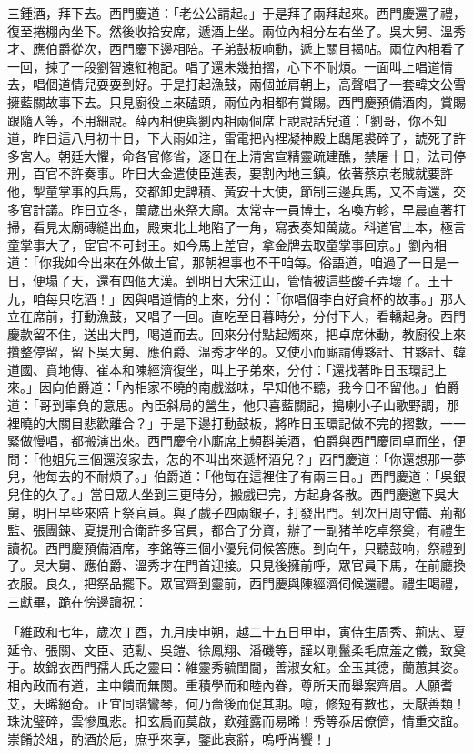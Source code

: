 \begin{showcontents}{}
三鍾酒，拜下去。西門慶道：「老公公請起。」于是拜了兩拜起來。西門慶還了禮，復至捲棚內坐下。然後收拾安席，遞酒上坐。兩位內相分左右坐了。吳大舅、溫秀才、應伯爵從次，西門慶下邊相陪。子弟鼓板响動，遞上關目揭帖。兩位內相看了一回，揀了一段劉智遠紅袍記。唱了還未幾拍摺，心下不耐煩。一面叫上唱道情去，唱個道情兒耍耍到好。于是打起漁鼓，兩個並肩朝上，高聲唱了一套韓文公雪擁藍關故事下去。只見廚役上來磕頭，兩位內相都有賞賜。西門慶預備酒肉，賞賜跟隨人等，不用細說。薛內相便與劉內相兩個席上說說話兒道：「劉哥，你不知道，昨日這八月初十日，下大雨如注，雷電把內裡凝神殿上鴟尾裘碎了，諕死了許多宮人。朝廷大懼，命各官修省，逐日在上清宮宣精靈疏建醮，禁屠十日，法司停刑，百官不許奏事。昨日大金遣使臣進表，要割內地三鎮。依著蔡京老賊就要許他，掣童掌事的兵馬，交都卸史譚積、黃安十大使，節制三邊兵馬，又不肯還，交多官計議。昨日立冬，萬歲出來祭大廟。太常寺一員博士，名喚方軫，早晨直著打掃，看見太廟磚縫出血，殿東北上地陷了一角，寫表奏知萬歲。科道官上本，極言童掌事大了，宦官不可封王。如今馬上差官，拿金牌去取童掌事回京。」劉內相道：「你我如今出來在外做土官，那朝裡事也不干咱每。俗語道，咱過了一日是一日，便塌了天，還有四個大漢。到明日大宋江山，管情被這些酸子弄壞了。王十九，咱每只吃酒！」因與唱道情的上來，分付：「你唱個李白好貪杯的故事。」那人立在席前，打動漁鼓，又唱了一回。直吃至日暮時分，分付下人，看轎起身。西門慶款留不住，送出大門，喝道而去。回來分付點起燭來，把卓席休動，教廚役上來攢整停留，留下吳大舅、應伯爵、溫秀才坐的。又使小而廝請傅夥計、甘夥計、韓道國、賁地傳、崔本和陳經濟復坐，叫上子弟來，分付：「還找著昨日玉環記上來。」因向伯爵道：「內相家不曉的南戲滋味，早知他不聽，我今日不留他。」伯爵道：「哥到辜負的意思。內臣斜局的營生，他只喜藍關記，搗喇小子山歌野調，那裡曉的大關目悲歡離合？」于是下邊打動鼓板，將昨日玉環記做不完的摺數，一一緊做慢唱，都搬演出來。西門慶令小廝席上頻斟美酒，伯爵與西門慶同卓而坐，便問：「他姐兒三個還沒家去，怎的不叫出來遞杯酒兒？」西門慶道：「你還想那一夢兒，他每去的不耐煩了。」伯爵道：「他每在這裡住了有兩三日。」西門慶道：「吳銀兒住的久了。」當日眾人坐到三更時分，搬戲已完，方起身各散。西門慶邀下吳大舅，明日早些來陪上祭官員。與了戲子四兩銀子，打發出門。到次日周守備、荊都監、張團鍊、夏提刑合衛許多官員，都合了分資，辦了一副猪羊吃卓祭奠，有禮生讀祝。西門慶預備酒席，李銘等三個小優兒伺候答應。到向午，只聽鼓响，祭禮到了。吳大舅、應伯爵、溫秀才在門首迎接。只見後擁前呼，眾官員下馬，在前廳換衣服。良久，把祭品擺下。眾官齊到靈前，西門慶與陳經濟伺候還禮。禮生喝禮，三獻畢，跪在傍邊讀祝：

「維政和七年，歲次丁酉，九月庚申朔，越二十五日甲申，寅侍生周秀、荊忠、夏延令、張關、文臣、范勳、吳鎧、徐鳳翔、潘磯等，謹以剛鬣柔毛庶羞之儀，致奠于。故錦衣西門孺人氏之靈曰：維靈秀毓閨閫，善淑女紅。金玉其德，蘭蕙其姿。相內政而有道，主中饋而無闋。重積學而和睦內眷，尊所天而舉案齊眉。人願耆艾，天晞絕奇。正宜同諧鸞琴，何乃嗇後而促其期。噫，修短有數也，天厭善類！珠沈璧碎，雲慘風悲。扣玄扃而莫啟，歎薤露而易晞！秀等忝居僚儕，情重交誼。崇餚於俎，酌酒於巵，庶乎來享，鑒此哀辭，嗚呼尚饗！」


\end{showcontents}
